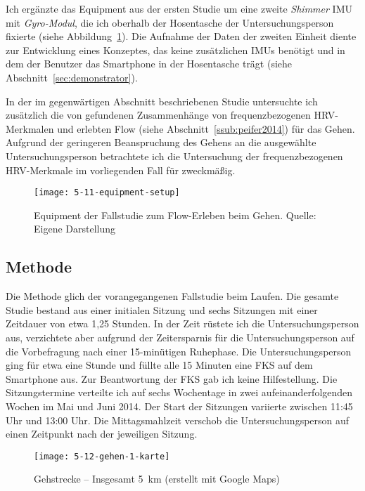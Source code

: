 Ich ergänzte das Equipment aus der ersten Studie um eine zweite \emph{Shimmer} \ac{IMU} mit \emph{Gyro-Modul}, die ich oberhalb der Hosentasche der Untersuchungsperson fixierte (siehe Abbildung~\ref{fig:5_11_equipment_setup}). Die Aufnahme der Daten der zweiten Einheit diente zur Entwicklung eines Konzeptes, das keine zusätzlichen \acp{IMU} benötigt und in dem der Benutzer das Smartphone in der Hosentasche trägt (siehe Abschnitt~\ref{sec:demonstrator}).

In der im gegenwärtigen Abschnitt beschriebenen Studie untersuchte ich zusätzlich die von \citet{Peifer2014} gefundenen Zusammenhänge von frequenzbezogenen \ac{HRV}-Merkmalen und erlebten Flow (siehe Abschnitt~\ref{ssub:peifer2014}) für das Gehen. Aufgrund der geringeren Beanspruchung des Gehens an die ausgewählte Untersuchungsperson betrachtete ich die Untersuchung der frequenzbezogenen \ac{HRV}-Merkmale im vorliegenden Fall für zweckmäßig.

\begin{figure}[t]
	\centering
		\texttt{[image: 5-11-equipment-setup]}
	\caption[Equipment der Fallstudie zum Flow-Erleben beim Gehen]{Equipment der Fallstudie zum Flow-Erleben beim Gehen. Quelle: Eigene Darstellung}
	\label{fig:5_11_equipment_setup}
\end{figure}

\subsection{Methode}
Die Methode glich der vorangegangenen Fallstudie beim Laufen. Die gesamte Studie bestand aus einer initialen Sitzung und sechs Sitzungen mit einer Zeitdauer von etwa 1,25 Stunden. In der Zeit rüstete ich die Untersuchungsperson aus, verzichtete aber aufgrund der Zeitersparnis für die Untersuchungsperson auf die Vorbefragung nach einer 15-minütigen Ruhephase. Die Untersuchungsperson ging für etwa eine Stunde und füllte alle 15 Minuten eine \ac{FKS} auf dem Smartphone aus. Zur Beantwortung der \ac{FKS} gab ich keine Hilfestellung. Die Sitzungstermine verteilte ich auf sechs Wochentage in zwei aufeinanderfolgenden Wochen im Mai und Juni 2014. Der Start der Sitzungen variierte zwischen 11:45 Uhr und 13:00 Uhr. Die Mittagsmahlzeit verschob die Untersuchungsperson auf einen Zeitpunkt nach der jeweiligen Sitzung.

\begin{figure}[t]
	\centering
		\texttt{[image: 5-12-gehen-1-karte]}
	\caption[Gehstrecke]{Gehstrecke -- Insgesamt 5~km (erstellt mit Google Maps)}
	\label{fig:5_12_gehen_1_karte}
\end{figure}

